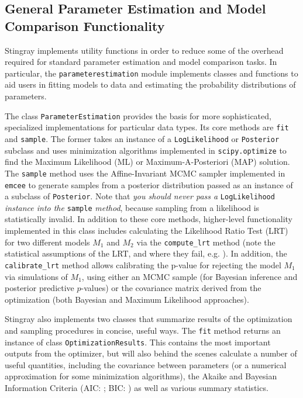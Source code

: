 \documentclass[twocolumn]{aastex62}
\begin{document}
\subsection{General Parameter Estimation and Model Comparison Functionality}

Stingray implements utility functions in order to reduce some of the overhead required for standard parameter estimation and model comparison tasks. In particular, the \verb|parameterestimation| module implements classes and functions to aid users in fitting models to data and estimating the probability distributions of parameters.

The class \texttt{ParameterEstimation} provides the basis for more sophisticated, specialized implementations for particular data types. Its core methods are \verb|fit| and \verb|sample|. The former takes an instance of a \verb|LogLikelihood| or \verb|Posterior| subclass and uses minimization algorithms implemented in \verb|scipy.optimize| to find the Maximum Likelihood (ML) or Maximum-A-Posteriori (MAP) solution. The \verb|sample| method uses the Affine-Invariant MCMC sampler implemented in \texttt{emcee} \citep{emcee} to generate samples from a posterior distribution passed as an instance of a subclass of \verb|Posterior|. Note that \textit{you should never pass a} \verb|LogLikelihood| \textit{instance into the} \verb|sample| \textit{method}, because sampling from a likelihood is statistically invalid. In addition to these core methods, higher-level functionality implemented in this class includes calculating the Likelihood Ratio Test (LRT) for two different models $M_1$ and $M_2$ via the \verb|compute_lrt| method (note the statistical assumptions of the LRT, and where they fail, e.g. \citealt{protassov2002}). In addition, the \verb|calibrate_lrt| method allows calibrating the p-value for rejecting the model $M_1$ via simulations of $M_1$, using either an MCMC sample (for Bayesian inference and posterior predictive $p$-values) or the covariance matrix derived from the optimization (both Bayesian and Maximum Likelihood approaches).

Stingray also implements two classes that summarize results of the optimization and sampling procedures in concise, useful ways. The \verb|fit| method returns an instance of class \verb|OptimizationResults|. This contains the most important outputs from the optimizer, but will also behind the scenes calculate a number of useful quantities, including the covariance between parameters (or a numerical approximation for some minimization algorithms), the Akaike and Bayesian Information Criteria (AIC: \citealt{akaike1974}; BIC: \citealt{schwarz1978}) as well as various summary statistics.%
\end{document}
